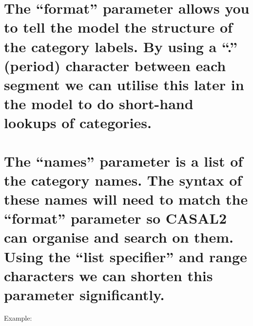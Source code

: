 \documentclass[a4paper,11pt,twoside,pdftex,draft]{article}
\begin{document}
\hypertarget{section}{%
\section{}\label{section}}

\hypertarget{the-format-parameter-allows-you-to-tell-the-model-the-structure-of-the-category-labels.-by-using-a-.-period-character-between-each-segment-we-can-utilise-this-later-in-the-model-to-do-short-hand-lookups-of-categories.}{%
\section{The ``format'' parameter allows you to tell the model the
structure of the category labels. By using a ``.'' (period) character
between each segment we can utilise this later in the model to do
short-hand lookups of
categories.}\label{the-format-parameter-allows-you-to-tell-the-model-the-structure-of-the-category-labels.-by-using-a-.-period-character-between-each-segment-we-can-utilise-this-later-in-the-model-to-do-short-hand-lookups-of-categories.}}

\hypertarget{section-1}{%
\section{}\label{section-1}}

\hypertarget{the-names-parameter-is-a-list-of-the-category-names.-the-syntax-of-these-names-will-need-to-match-the-format-parameter-so-casal2-can-organise-and-search-on-them.-using-the-list-specifier-and-range-characters-we-can-shorten-this-parameter-significantly.}{%
\section{The ``names'' parameter is a list of the category names. The
syntax of these names will need to match the ``format'' parameter so
CASAL2 can organise and search on them. Using the ``list specifier'' and
range characters we can shorten this parameter
significantly.}\label{the-names-parameter-is-a-list-of-the-category-names.-the-syntax-of-these-names-will-need-to-match-the-format-parameter-so-casal2-can-organise-and-search-on-them.-using-the-list-specifier-and-range-characters-we-can-shorten-this-parameter-significantly.}}

Example:
\end{document}
